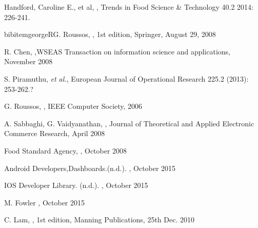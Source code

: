 \documentclass[a4paper, 11pt]{article}
\begin{document}
\begin{thebibliography}{29}
Handford, Caroline E., et al, \emph{}, Trends in Food Science \& Technology 40.2 2014: 226-241.
\vspace{\baselineskip}

bibitem{georgeR}G. Roussos, \emph{}, 1st edition, Springer, August 29, 2008
\vspace{\baselineskip}

 R. Chen, \emph{},WSEAS Transaction on information science and applications, November 2008
\vspace{\baselineskip}

S. Piramuthu, \emph{et al.}, \emph{} European Journal of Operational Research 225.2 (2013): 253-262.?\vspace{\baselineskip}

G. Roussos, \emph{}, IEEE Computer Society, 2006
\vspace{\baselineskip}

A. Sabbaghi, G. Vaidyanathan, \emph{}, Journal of Theoretical and Applied Electronic Commerce Research, April 2008

Food Standard Agency, \emph{}, October 2008
\vspace{\baselineskip}

Android Developers,Dashboards.(n.d.). \emph{}, October 2015
\vspace{\baselineskip}

IOS Developer Library. (n.d.). \emph{}, October 2015
\vspace{\baselineskip}

M. Fowler \emph{}, October 2015
\vspace{\baselineskip}

C. Lam, \emph{}, 1st edition, Manning Publications, 25th Dec. 2010
\vspace{\baselineskip}


\end{thebibliography}
\end{document}
